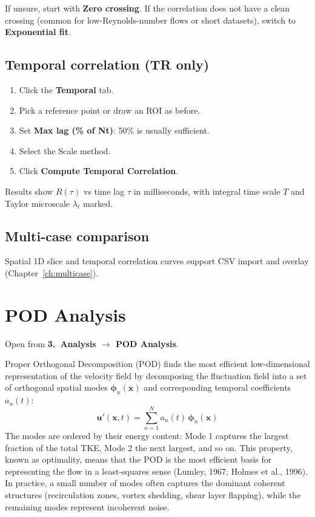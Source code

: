 \documentclass[11pt, a4paper]{report}
\newcommand{\uipth}[1]{\textbf{\textcolor{upblue}{#1}}}
\begin{document}
\begin{tipbox}
If unsure, start with \textbf{Zero crossing}. If the correlation does not have a clean crossing (common for low-Reynolds-number flows or short datasets), switch to \textbf{Exponential fit}.
\end{tipbox}

\section{Temporal correlation (TR only)}

\begin{stepbox}
\begin{enumerate}[leftmargin=1.5em, topsep=2pt]
  \item Click the \uipth{Temporal} tab.
  \item Pick a reference point or draw an ROI as before.
  \item Set \uipth{Max lag (\% of Nt)}: 50\% is usually sufficient.
  \item Select the Scale method.
  \item Click \uipth{Compute Temporal Correlation}.
\end{enumerate}
\end{stepbox}

Results show $R(\tau)$ vs time lag $\tau$ in milliseconds, with integral time scale $T$ and Taylor microscale $\lambda_t$ marked.

\section{Multi-case comparison}

Spatial 1D slice and temporal correlation curves support CSV import and overlay (Chapter~\ref{ch:multicase}).

\chapter{POD Analysis}
\label{ch:pod}

Open from \uipth{3.\ Analysis $\to$ POD Analysis}.

Proper Orthogonal Decomposition (POD) finds the most efficient low-dimensional representation of the velocity field by decomposing the fluctuation field into a set of orthogonal spatial modes $\boldsymbol{\phi}_n(\mathbf{x})$ and corresponding temporal coefficients $a_n(t)$:
\[
\mathbf{u}'(\mathbf{x}, t) = \sum_{n=1}^{N} a_n(t)\,\boldsymbol{\phi}_n(\mathbf{x})
\]
The modes are ordered by their energy content: Mode 1 captures the largest fraction of the total TKE, Mode 2 the next largest, and so on. This property, known as optimality, means that the POD is the most efficient basis for representing the flow in a least-squares sense (Lumley, 1967; Holmes et al., 1996). In practice, a small number of modes often captures the dominant coherent structures (recirculation zones, vortex shedding, shear layer flapping), while the remaining modes represent incoherent noise.
\end{document}
